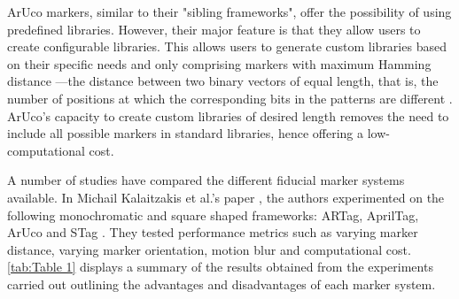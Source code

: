\documentclass[12pt,a4paper]{report}
\def\aruco{ArUco }
\begin{document}
\aruco markers, similar to their "sibling frameworks", offer the possibility of using predefined libraries. However, their major feature is that they allow users to create configurable libraries. This allows users to generate custom libraries based on their specific needs and only comprising markers with maximum Hamming distance \cite{FMforposeestimation}---the distance between two binary vectors of equal length, that is, the number of positions at which the corresponding bits in the patterns are different \cite{ALTAWELL202247}. ArUco's capacity to create custom libraries of desired length removes the need to include all possible markers in standard libraries, hence offering a low-computational cost.

A number of studies \cite{comparearandapriltag}\cite{compareartagartoolkitplus} have compared the different fiducial marker systems available. In Michail Kalaitzakis et al.'s paper \cite{FMforposeestimation}, the authors experimented on the following monochromatic and square shaped frameworks: ARTag, AprilTag, \aruco and STag \cite{stag}. They tested performance metrics such as varying marker distance, varying marker orientation, motion blur and computational cost. \autoref{tab:Table 1} displays a summary of the results obtained from the experiments carried out outlining the advantages and disadvantages of each marker system.
\end{document}

